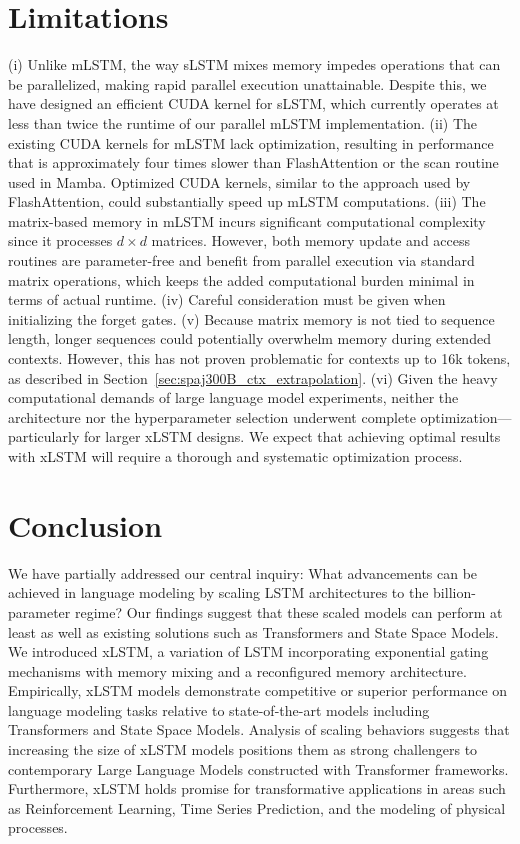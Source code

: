\section{Limitations}

(i) Unlike mLSTM, the way sLSTM mixes memory impedes operations that can be parallelized, making rapid parallel execution unattainable. Despite this, we have designed an efficient CUDA kernel for sLSTM, which currently operates at less than twice the runtime of our parallel mLSTM implementation. (ii) The existing CUDA kernels for mLSTM lack optimization, resulting in performance that is approximately four times slower than FlashAttention or the scan routine used in Mamba. Optimized CUDA kernels, similar to the approach used by FlashAttention, could substantially speed up mLSTM computations. (iii) The matrix-based memory in mLSTM incurs significant computational complexity since it processes $d \times d$ matrices. However, both memory update and access routines are parameter-free and benefit from parallel execution via standard matrix operations, which keeps the added computational burden minimal in terms of actual runtime. (iv) Careful consideration must be given when initializing the forget gates. (v) Because matrix memory is not tied to sequence length, longer sequences could potentially overwhelm memory during extended contexts. However, this has not proven problematic for contexts up to 16k tokens, as described in Section~\ref{sec:spaj300B_ctx_extrapolation}. (vi) Given the heavy computational demands of large language model experiments, neither the architecture nor the hyperparameter selection underwent complete optimization—particularly for larger xLSTM designs. We expect that achieving optimal results with xLSTM will require a thorough and systematic optimization process.

\section{Conclusion}
We have partially addressed our central inquiry: What advancements can be achieved in language modeling by scaling LSTM architectures to the billion-parameter regime? Our findings suggest that these scaled models can perform at least as well as existing solutions such as Transformers and State Space Models. We introduced xLSTM, a variation of LSTM incorporating exponential gating mechanisms with memory mixing and a reconfigured memory architecture. Empirically, xLSTM models demonstrate competitive or superior performance on language modeling tasks relative to state-of-the-art models including Transformers and State Space Models. Analysis of scaling behaviors suggests that increasing the size of xLSTM models positions them as strong challengers to contemporary Large Language Models constructed with Transformer frameworks. Furthermore, xLSTM holds promise for transformative applications in areas such as Reinforcement Learning, Time Series Prediction, and the modeling of physical processes.

